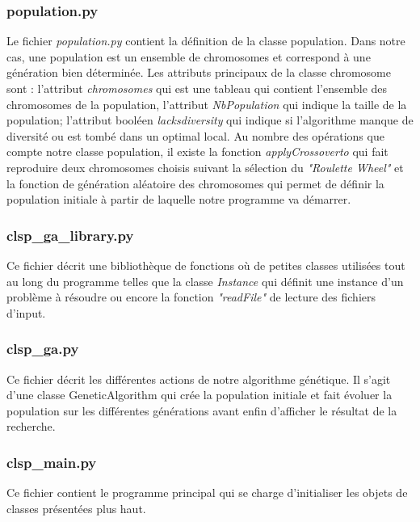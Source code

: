 \documentclass[11pt,a4paper]{article}
\begin{document}
	\subsubsection*{population.py} 
	Le fichier \emph{population.py} contient la définition de la classe population. Dans notre cas, une population est un ensemble de chromosomes et correspond à une génération bien déterminée. Les attributs principaux de la classe chromosome sont : l'attribut \emph{chromosomes} qui est une tableau qui contient l'ensemble des chromosomes de la population, l'attribut \emph{NbPopulation} qui indique la taille de la population; l'attribut booléen \emph{lacksdiversity} qui indique si l'algorithme manque de diversité ou est tombé dans un optimal local. Au nombre des opérations que compte notre classe population, il existe la fonction \emph{applyCrossoverto} qui fait reproduire deux chromosomes choisis suivant la sélection du \emph{"Roulette Wheel"} et la fonction de génération aléatoire des chromosomes qui permet de définir la population initiale à partir de laquelle notre programme va démarrer.
	
	\subsubsection*{clsp\_ga\_library.py}
	Ce fichier décrit une bibliothèque de fonctions où de petites classes utilisées tout au long du programme telles que la classe \emph{Instance} qui définit une instance d'un problème à résoudre ou encore la fonction \emph{"readFile"} de lecture des fichiers d'input.
	
	\subsubsection*{clsp\_ga.py}
	Ce fichier décrit les différentes actions de notre algorithme génétique. Il s'agit d'une classe GeneticAlgorithm qui crée la population initiale et fait évoluer la population sur les différentes générations avant enfin d'afficher le résultat de la recherche.
	
	\subsubsection*{clsp\_main.py} 
	Ce fichier contient le programme principal qui se charge d'initialiser les objets de classes présentées plus haut.\\
	
\end{document}
